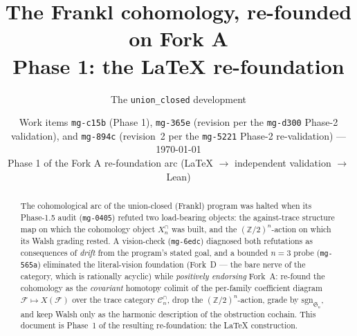 \documentclass[11pt,oneside]{amsart}
\title[The Frankl cohomology re-founded on Fork A]{%
  The Frankl cohomology, re-founded on Fork A\\
  \normalsize Phase 1: the LaTeX re-foundation}
\author{The \texttt{union\_closed} development}
\date{Work items \texttt{mg-c15b} (Phase 1), \texttt{mg-365e}
  (revision per the \texttt{mg-d300} Phase-2 validation), and
  \texttt{mg-894c} (revision~2 per the \texttt{mg-5221} Phase-2
  re-validation) --- \today\\[2pt]
  \normalfont\small Phase 1 of the Fork A re-foundation arc
  (LaTeX $\to$ independent validation $\to$ Lean)}
\theoremstyle{plain}
\theoremstyle{definition}
\theoremstyle{remark}
\theoremstyle{honeststyle}
\newcommand{\F}{\mathcal{F}}
\newcommand{\sgn}{\mathrm{sgn}}
\newcommand{\Sym}{\mathfrak{S}}
\newcommand{\Z}{\mathbb{Z}}
\newcommand{\Cn}{\mathcal{C}^{\cap}_n}
\begin{document}
\begin{abstract}
The cohomological arc of the union-closed (Frankl) program was halted
when its Phase-1.5 audit (\texttt{mg-0405}) refuted two load-bearing
objects: the against-trace structure map on which the cohomology object
$X^{\cap}_n$ was built, and the $(\Z/2)^n$-action on which its Walsh
grading rested. A vision-check (\texttt{mg-6edc}) diagnosed both
refutations as consequences of \emph{drift} from the program's stated
goal, and a bounded $n=3$ probe (\texttt{mg-565a}) eliminated the
literal-vision foundation (Fork~D --- the bare nerve of the category,
which is rationally acyclic) while \emph{positively endorsing} Fork~A:
re-found the cohomology as the \emph{covariant} homotopy colimit of the
per-family coefficient diagram $\F\mapsto X(\F)$ over the trace
category $\Cn$, drop the $(\Z/2)^n$-action, grade by $\sgn_{\Sym_n}$,
and keep Walsh only as the harmonic description of the obstruction
cochain. This document is Phase~1 of the resulting re-foundation: the
LaTeX construction.


\end{abstract}
\end{document}
